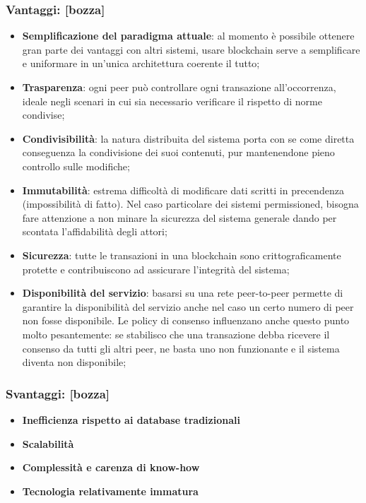 		\subsubsection{Vantaggi: [bozza]}
			\begin{itemize}
				\item \textbf{Semplificazione del paradigma attuale}: al momento è possibile ottenere gran parte dei vantaggi con altri sistemi, usare blockchain serve a semplificare e uniformare in un'unica architettura coerente il tutto;
				\item \textbf{Trasparenza}: ogni peer può controllare ogni transazione all'occorrenza, ideale negli scenari in cui sia necessario verificare il rispetto di norme condivise;
				\item \textbf{Condivisibilità}: la natura distribuita del sistema porta con se come diretta conseguenza la condivisione dei suoi contenuti, pur mantenendone pieno controllo sulle modifiche;
				\item \textbf{Immutabilità}: estrema difficoltà di modificare dati scritti in precendenza (impossibilità di fatto). Nel caso particolare dei sistemi permissioned, bisogna fare attenzione a non minare la sicurezza del sistema generale dando per scontata l'affidabilità degli attori;
				\item \textbf{Sicurezza}: tutte le transazioni in una blockchain sono crittograficamente protette e contribuiscono ad assicurare l'integrità del sistema;
				\item \textbf{Disponibilità del servizio}: basarsi su una rete peer-to-peer permette di garantire la disponibilità del servizio anche nel caso un certo numero di peer non fosse disponibile. Le policy di consenso influenzano anche questo punto molto pesantemente: se stabilisco che una transazione debba ricevere il consenso da tutti gli altri peer, ne basta uno non funzionante e il sistema diventa non disponibile;
			\end{itemize}
		\subsubsection{Svantaggi: [bozza]}
			\begin{itemize}
				\item \textbf{Inefficienza rispetto ai database tradizionali}
				\item \textbf{Scalabilità}
				\item \textbf{Complessità e carenza di know-how}
				\item \textbf{Tecnologia relativamente immatura}
			\end{itemize}
		
